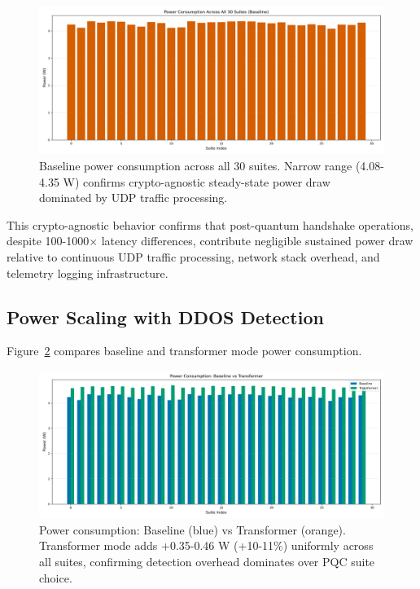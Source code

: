 \documentclass[11pt,a4paper]{article}
\begin{document}
\begin{figure}[H]
\centering
\includegraphics[width=\textwidth]{../figures/figure08_power_vs_suite_baseline.png}
\caption{Baseline power consumption across all 30 suites. Narrow range (4.08-4.35 W) confirms crypto-agnostic steady-state power draw dominated by UDP traffic processing.}
\label{fig:power_baseline}
\end{figure}

This crypto-agnostic behavior confirms that post-quantum handshake operations, despite 100-1000× latency differences, contribute negligible sustained power draw relative to continuous UDP traffic processing, network stack overhead, and telemetry logging infrastructure.

\subsection{Power Scaling with DDOS Detection}

Figure~\ref{fig:power_comparison} compares baseline and transformer mode power consumption.

\begin{figure}[H]
\centering
\includegraphics[width=\textwidth]{../figures/figure09_power_vs_suite_transformer_comparison.png}
\caption{Power consumption: Baseline (blue) vs Transformer (orange). Transformer mode adds +0.35-0.46 W (+10-11\%) uniformly across all suites, confirming detection overhead dominates over PQC suite choice.}
\label{fig:power_comparison}
\end{figure}
\end{document}
